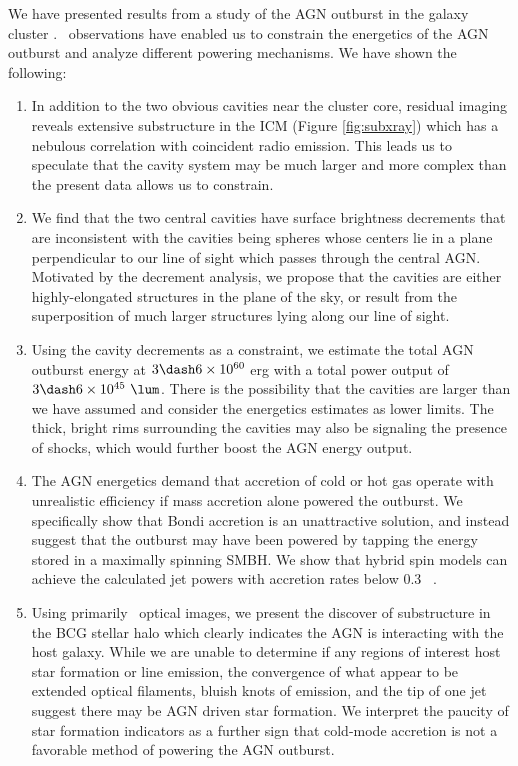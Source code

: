 \documentclass[iop]{emulateapj-rtx4}
\begin{document}
We have presented results from a study of the AGN outburst in the
galaxy cluster \rbs. \cxo\ observations have enabled us to constrain
the energetics of the AGN outburst and analyze different powering
mechanisms. We have shown the following:
\begin{enumerate}
\item In addition to the two obvious cavities near the cluster core,
  residual imaging reveals extensive substructure in the ICM (Figure
  \ref{fig:subxray}) which has a nebulous correlation with coincident
  radio emission. This leads us to speculate that the cavity system
  may be much larger and more complex than the present data allows us
  to constrain.
\item We find that the two central cavities have surface brightness
  decrements that are inconsistent with the cavities being spheres
  whose centers lie in a plane perpendicular to our line of sight which
  passes through the central AGN. Motivated by the decrement analysis,
  we propose that the cavities are either highly-elongated structures
  in the plane of the sky, or result from the superposition of much
  larger structures lying along our line of sight.
\item Using the cavity decrements as a constraint, we estimate the
  total AGN outburst energy at $3 \dash 6 \times 10^{60}$ erg with a
  total power output of $3 \dash 6 \times 10^{45} ~\lum$. There is the
  possibility that the cavities are larger than we have assumed and
  consider the energetics estimates as lower limits. The thick, bright
  rims surrounding the cavities may also be signaling the presence of
  shocks, which would further boost the AGN energy output.
\item The AGN energetics demand that accretion of cold or hot gas
  operate with unrealistic efficiency if mass accretion alone powered
  the outburst. We specifically show that Bondi accretion is an
  unattractive solution, and instead suggest that the outburst may
  have been powered by tapping the energy stored in a maximally
  spinning SMBH. We show that hybrid spin models can achieve the
  calculated jet powers with accretion rates below 0.3 ~\msolpy.
\item Using primarily \hst\ optical images, we present the discover of
  substructure in the BCG stellar halo which clearly indicates the AGN
  is interacting with the host galaxy. While we are unable to
  determine if any regions of interest host star formation or line
  emission, the convergence of what appear to be extended optical
  filaments, bluish knots of emission, and the tip of one jet suggest
  there may be AGN driven star formation. We interpret the paucity of
  star formation indicators as a further sign that cold-mode accretion
  is not a favorable method of powering the AGN outburst.
\end{enumerate}
\end{document}
